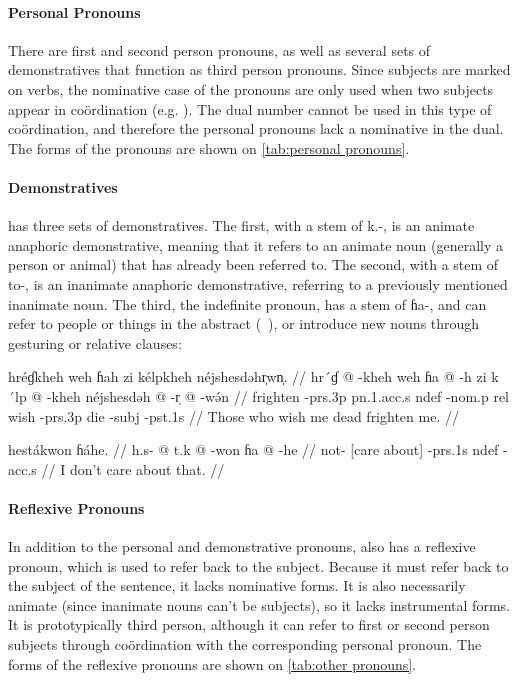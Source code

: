 \paragraph{Personal Pronouns} There are first and second person pronouns, as
well as several sets of demonstratives that function as third person pronouns.
Since subjects are marked on verbs, the nominative case of the pronouns are
only used when two subjects appear in coördination (e.g. ). The dual number cannot be used in this type of coördination, and
therefore the personal pronouns lack a nominative in the dual. The forms of the
pronouns are shown on \cref{tab:personal pronouns}.

\paragraph{Demonstratives} \Langname{} has three sets of demonstratives. The
first, with a stem of {\ll k.-}, is an animate anaphoric demonstrative, meaning
that it refers to an animate noun (generally a person or animal) that has
already been referred to. The second, with a stem of {\ll to-}, is an
inanimate anaphoric demonstrative, referring to a previously mentioned
inanimate noun. The third, the indefinite pronoun, has a stem of {\ll ɦa-}, and
can refer to people or things in the abstract (\ie\ ), or introduce
new nouns through gesturing or relative clauses:

\pex
\a
\begingl
\glpreamble hréɠkheh weh ɦah zi kélpkheh néjshesdəhr̩wn̩. //
\gla hr´ɠ @ -kheh weh ɦa @ -h zi k´lp @ -kheh néjshesdəh @ -r̩ @
-wə́n //
\glb frighten -{\sc prs}.3p {\sc pn}.1.{\sc acc}.s {\sc ndef} -{\sc nom}.p {\sc
    rel} wish -{\sc prs}.3p die -{\sc subj} -{\sc pst}.1s //
\glft Those who wish me dead frighten me. //
\endgl

\a
\begingl
    \glpreamble hestákwon ɦáhe. //
    \gla h.s- @ t.k @ -won ɦa @ -he //
    \glb not- {[care about]} -{\sc prs}.1s {\sc ndef} -{\sc acc}.s //
    \glft I don't care about that. //
\endgl
\xe

\paragraph{Reflexive Pronouns} In addition to the personal and demonstrative
pronouns, \Langname{} also has a reflexive pronoun, which is used to
refer back to the subject. Because it must refer back to the subject of the
sentence, it lacks nominative forms. It is also necessarily animate (since
inanimate nouns can't be subjects), so it lacks instrumental forms. It is
prototypically third person, although it can refer to first or second person
subjects through coördination with the corresponding personal pronoun. The
forms of the reflexive pronouns are shown on \cref{tab:other pronouns}.

